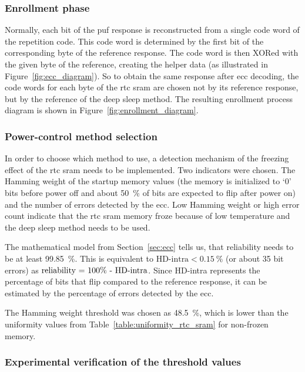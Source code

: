 \subsubsection*{Enrollment phase}

Normally, each bit of the \gls{puf} response is reconstructed from a single code word of the repetition code. This code word is determined by the first bit of the corresponding byte of the reference response. The code word is then XORed with the given byte of the reference, creating the helper data (as illustrated in Figure~\ref{fig:ecc_diagram}). So to obtain the same response after \gls{ecc} decoding, the code words for each byte of the \gls{rtc} \gls{sram} are chosen not by its reference response, but by the reference of the deep sleep method. The resulting enrollment process diagram is shown in Figure~\ref{fig:enrollment_diagram}.

\subsubsection*{Power-control method selection}

In order to choose which method to use, a detection mechanism of the freezing effect of the \gls{rtc} \gls{sram} needs to be implemented. Two indicators were chosen. The Hamming weight of the startup memory values (the memory is initialized to `0' bits before power off and about 50~\% of bits are expected to flip after power on) and the number of errors detected by the \gls{ecc}. Low Hamming weight or high error count indicate that the \gls{rtc} \gls{sram} memory froze because of low temperature and the deep sleep method needs to be used.

The mathematical model from Section~\ref{sec:ecc} tells us, that reliability needs to be at least 99.85~\%. This is equivalent to $\textrm{HD-intra} < 0.15~\%$ (or about 35 bit errors) as $\textrm{reliability = 100\% - \textrm{HD-intra}}$. Since HD-intra represents the percentage of bits that flip compared to the reference response, it can be estimated by the percentage of errors detected by the \gls{ecc}.

The Hamming weight threshold was chosen as 48.5~\%, which is lower than the uniformity values from Table~\ref{table:uniformity_rtc_sram} for non-frozen memory.

\subsubsection*{Experimental verification of the threshold values}


